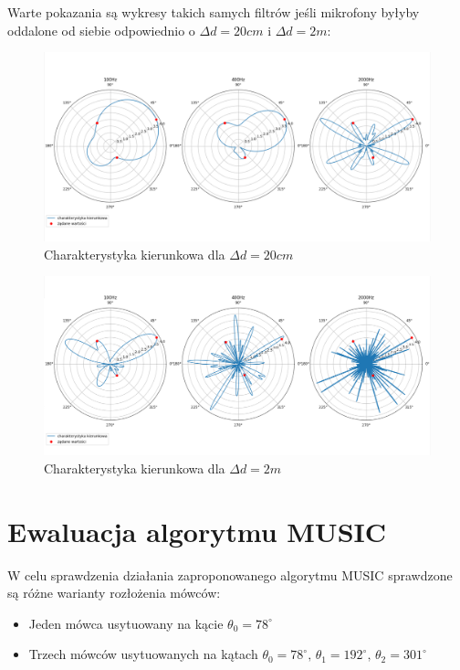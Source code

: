 \noindent Warte pokazania są wykresy takich samych filtrów jeśli mikrofony byłyby oddalone od siebie odpowiednio o $\Delta d = 20cm$ i $\Delta d = 2m$:

\begin{figure}[h!]
    \centering
    \includegraphics[width=\textwidth]{Images/directivity0.2m.png}
    \caption{Charakterystyka kierunkowa dla $\Delta d = 20cm$}
    \label{fig:directivity0.2}
\end{figure}

\begin{figure}[h!]
    \centering
    \includegraphics[width=\textwidth]{Images/directivity2m.png}
    \caption{Charakterystyka kierunkowa dla $\Delta d = 2m$}
    \label{fig:directivity2}
\end{figure}

\newpage

\section{Ewaluacja algorytmu MUSIC}

\noindent W celu sprawdzenia działania zaproponowanego algorytmu MUSIC sprawdzone są różne warianty rozłożenia mówców:

\begin{itemize}
    \item Jeden mówca usytuowany na kącie $\theta_{0} = 78^{\circ}$

    \item Trzech mówców usytuowanych na kątach $\theta_{0} = 78^{\circ}, \, \theta_{1} = 192^{\circ}, \, \theta_{2} = 301^{\circ}$
    
\end{itemize}


